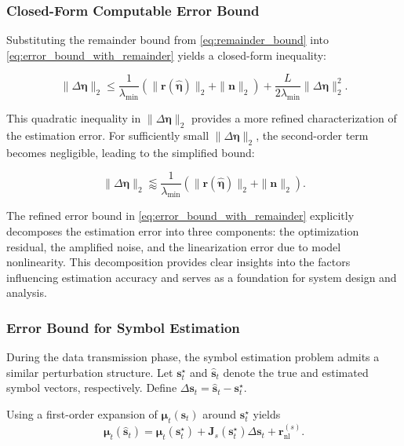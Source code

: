 \documentclass[journal]{IEEEtran}
\begin{document}
\subsubsection{Closed-Form Computable Error Bound}
Substituting the remainder bound from \eqref{eq:remainder_bound} into \eqref{eq:error_bound_with_remainder} yields a closed-form inequality:

\begin{equation}
\|\Delta\boldsymbol{\eta}\|_2 \leq \frac{1}{\lambda_{\min}} \left( \|\mathbf{r}(\hat{\boldsymbol{\eta}})\|_2 + \|\mathbf{n}\|_2 \right) + \frac{L}{2\lambda_{\min}} \|\Delta\boldsymbol{\eta}\|_2^2.
\label{eq:closed_form_bound}
\end{equation}

This quadratic inequality in $\|\Delta\boldsymbol{\eta}\|_2$ provides a more refined characterization of the estimation error. For sufficiently small $\|\Delta\boldsymbol{\eta}\|_2$, the second-order term becomes negligible, leading to the simplified bound:

\begin{equation}
\|\Delta\boldsymbol{\eta}\|_2 \lessapprox \frac{1}{\lambda_{\min}} \left( \|\mathbf{r}(\hat{\boldsymbol{\eta}})\|_2 + \|\mathbf{n}\|_2 \right).
\label{eq:simplified_bound}
\end{equation}

The refined error bound in \eqref{eq:error_bound_with_remainder} explicitly decomposes the estimation error into three components: the optimization residual, the amplified noise, and the linearization error due to model nonlinearity. This decomposition provides clear insights into the factors influencing estimation accuracy and serves as a foundation for system design and analysis.

\subsubsection{Error Bound for Symbol Estimation}

During the data transmission phase, the symbol estimation problem admits a
similar perturbation structure.
Let $\mathbf{s}_t^{\star}$ and $\hat{\mathbf{s}}_t$ denote the true and estimated
symbol vectors, respectively.
Define $\Delta \mathbf{s}_t = \hat{\mathbf{s}}_t - \mathbf{s}_t^{\star}$.

Using a first-order expansion of
$\boldsymbol{\mu}_t(\mathbf{s}_t)$ around $\mathbf{s}_t^{\star}$ yields
\begin{equation}
\boldsymbol{\mu}_t(\hat{\mathbf{s}}_t)
=
\boldsymbol{\mu}_t(\mathbf{s}_t^{\star})
+
\mathbf{J}_s(\mathbf{s}_t^{\star})
\Delta \mathbf{s}_t
+
\mathbf{r}_{\mathrm{nl}}^{(s)}.
\end{equation}
\end{document}

